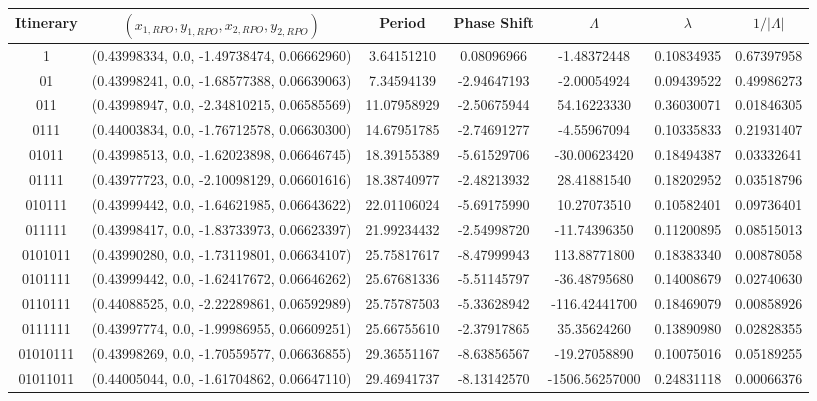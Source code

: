 \begin{table}
	\begin{tabular}{c|c|c|c|c|c|c}
	Itinerary & $(x_{1,RPO}, y_{1,RPO}, x_{2,RPO}, y_{2,RPO})$ & Period & Phase Shift & $\Lambda$ & $\lambda$ & $1/|\Lambda|$ \\ 
	\hline
	1 & (0.43998334,   0.0, -1.49738474, 0.06662960) & 3.64151210 & 0.08096966 & -1.48372448 &0.10834935 &0.67397958 \\ 
 	01 & (0.43998241,   0.0, -1.68577388, 0.06639063) & 7.34594139 & -2.94647193 & -2.00054924 &0.09439522 &0.49986273 \\ 
 	011 & (0.43998947,   0.0, -2.34810215, 0.06585569) & 11.07958929 & -2.50675944 & 54.16223330 &0.36030071 &0.01846305 \\ 
 	0111 & (0.44003834,   0.0, -1.76712578, 0.06630300) & 14.67951785 & -2.74691277 & -4.55967094 &0.10335833 &0.21931407 \\ 
 	01011 & (0.43998513,   0.0, -1.62023898, 0.06646745) & 18.39155389 & -5.61529706 & -30.00623420 &0.18494387 &0.03332641 \\ 
 	01111 & (0.43977723,   0.0, -2.10098129, 0.06601616) & 18.38740977 & -2.48213932 & 28.41881540 &0.18202952 &0.03518796 \\ 
 	010111 & (0.43999442,   0.0, -1.64621985, 0.06643622) & 22.01106024 & -5.69175990 & 10.27073510 &0.10582401 &0.09736401 \\ 
 	011111 & (0.43998417,   0.0, -1.83733973, 0.06623397) & 21.99234432 & -2.54998720 & -11.74396350 &0.11200895 &0.08515013 \\ 
 	0101011 & (0.43990280,   0.0, -1.73119801, 0.06634107) & 25.75817617 & -8.47999943 & 113.88771800 &0.18383340 &0.00878058 \\ 
 	0101111 & (0.43999442,   0.0, -1.62417672, 0.06646262) & 25.67681336 & -5.51145797 & -36.48795680 &0.14008679 &0.02740630 \\ 
 	0110111 & (0.44088525,   0.0, -2.22289861, 0.06592989) & 25.75787503 & -5.33628942 & -116.42441700 &0.18469079 &0.00858926 \\ 
 	0111111 & (0.43997774,   0.0, -1.99986955, 0.06609251) & 25.66755610 & -2.37917865 & 35.35624260 &0.13890980 &0.02828355 \\ 
 	01010111 & (0.43998269,   0.0, -1.70559577, 0.06636855) & 29.36551167 & -8.63856567 & -19.27058890 &0.10075016 &0.05189255 \\ 
 	01011011 & (0.44005044,   0.0, -1.61704862, 0.06647110) & 29.46941737 & -8.13142570 & -1506.56257000 &0.24831118 &0.00066376 \\ 

\end{tabular}
\end{table}
